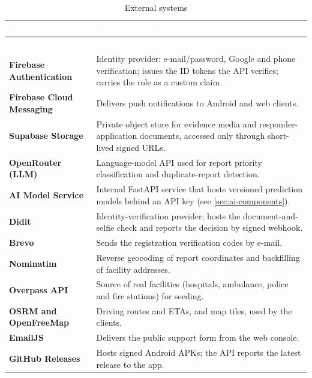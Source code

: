 {\tabfont\rowband
\begin{longtable}{@{}>{\raggedright\arraybackslash}p{}>{\raggedright\arraybackslash}p{}@{}}
\caption{External systems}\label{tab:system-actors}\\
\rowcolor{najdanavy}\textcolor{white}{\sffamily\bfseries\small System actor} & \textcolor{white}{\sffamily\bfseries\small Role in the platform}\\
\endfirsthead
\rowcolor{najdanavy}\textcolor{white}{\sffamily\bfseries\small System actor} & \textcolor{white}{\sffamily\bfseries\small Role in the platform}\\
\endhead
\bottomrule\endlastfoot
\textbf{Firebase Authentication} & Identity provider: e-mail/\allowbreak{}password, Google and phone verification; issues the ID tokens the API verifies; carries the role as a custom claim.\\
\textbf{Firebase Cloud Messaging} & Delivers push notifications to Android and web clients.\\
\textbf{Supabase Storage} & Private object store for evidence media and responder-application documents, accessed only through short-lived signed URLs.\\
\textbf{OpenRouter (LLM)} & Language-model API used for report priority classification and duplicate-report detection.\\
\textbf{AI Model Service} & Internal FastAPI service that hosts versioned prediction models behind an API key (see \cref{sec:ai-components}).\\
\textbf{Didit} & Identity-verification provider; hosts the document-and-selfie check and reports the decision by signed webhook.\\
\textbf{Brevo} & Sends the registration verification codes by e-mail.\\
\textbf{Nominatim} & Reverse geocoding of report coordinates and backfilling of facility addresses.\\
\textbf{Overpass API} & Source of real facilities (hospitals, ambulance, police and fire stations) for seeding.\\
\textbf{OSRM and OpenFreeMap} & Driving routes and ETAs, and map tiles, used by the clients.\\
\textbf{EmailJS} & Delivers the public support form from the web console.\\
\textbf{GitHub Releases} & Hosts signed Android APKs; the API reports the latest release to the app.\\
\end{longtable}}
